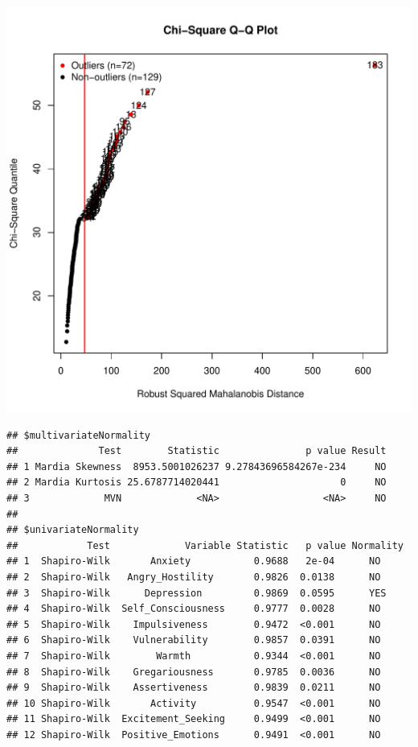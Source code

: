 \documentclass{article}\usepackage[]{graphicx}\usepackage[]{color}
\makeatletter
\def\maxwidth{ %
  \ifdim\Gin@nat@width>\linewidth
    \linewidth
  \else
    \Gin@nat@width
  \fi
}
\newenvironment{kframe}{%
 \def\at@end@of@kframe{}%
 \ifinner\ifhmode%
  \def\at@end@of@kframe{\end{minipage}}%
  \begin{minipage}{\columnwidth}%
 \fi\fi%
 \def\FrameCommand##1{\hskip\@totalleftmargin \hskip-\fboxsep
 \colorbox{shadecolor}{##1}\hskip-\fboxsep
     \hskip-\linewidth \hskip-\@totalleftmargin \hskip\columnwidth}%
 \MakeFramed {\advance\hsize-\width
   \@totalleftmargin\z@ \linewidth\hsize
   \@setminipage}}%
 {\par\unskip\endMakeFramed%
 \at@end@of@kframe}
\newenvironment{knitrout}{}{} %
\makeatother
\begin{document}
\begin{knitrout}
\includegraphics[width=\maxwidth]{figure/unnamed-chunk-5-2} 
\begin{kframe}\begin{verbatim}
## $multivariateNormality
##              Test        Statistic               p value Result
## 1 Mardia Skewness  8953.5001026237 9.27843696584267e-234     NO
## 2 Mardia Kurtosis 25.6787714020441                     0     NO
## 3             MVN             <NA>                  <NA>     NO
## 
## $univariateNormality
##            Test             Variable Statistic   p value Normality
## 1  Shapiro-Wilk       Anxiety           0.9688   2e-04      NO    
## 2  Shapiro-Wilk   Angry_Hostility       0.9826  0.0138      NO    
## 3  Shapiro-Wilk      Depression         0.9869  0.0595      YES   
## 4  Shapiro-Wilk  Self_Consciousness     0.9777  0.0028      NO    
## 5  Shapiro-Wilk    Impulsiveness        0.9472  <0.001      NO    
## 6  Shapiro-Wilk    Vulnerability        0.9857  0.0391      NO    
## 7  Shapiro-Wilk        Warmth           0.9344  <0.001      NO    
## 8  Shapiro-Wilk    Gregariousness       0.9785  0.0036      NO    
## 9  Shapiro-Wilk    Assertiveness        0.9839  0.0211      NO    
## 10 Shapiro-Wilk       Activity          0.9547  <0.001      NO    
## 11 Shapiro-Wilk  Excitement_Seeking     0.9499  <0.001      NO    
## 12 Shapiro-Wilk  Positive_Emotions      0.9491  <0.001      NO    

\end{verbatim}
\end{kframe}
\end{knitrout}
\end{document}
